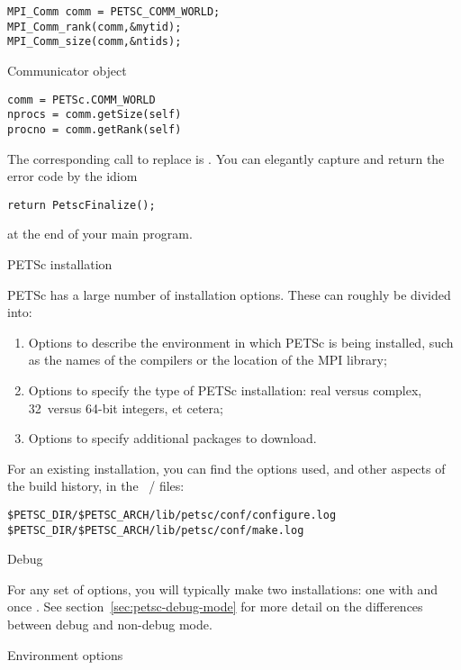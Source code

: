 \begin{lstlisting}
MPI_Comm comm = PETSC_COMM_WORLD;
MPI_Comm_rank(comm,&mytid);
MPI_Comm_size(comm,&ntids);
\end{lstlisting}

\begin{pythonnote}{Communicator object}
\begin{verbatim}
comm = PETSc.COMM_WORLD
nprocs = comm.getSize(self) 
procno = comm.getRank(self)
\end{verbatim}
\end{pythonnote}

The corresponding call to replace  is
.
You can elegantly capture and return the error code by the idiom
\begin{lstlisting}
return PetscFinalize();
\end{lstlisting}
at the end of your main program.

 {PETSc installation}
\label{sec:petsc-install}

PETSc has a large number of installation options. These can roughly be
divided into:
\begin{enumerate}
\item Options to describe the environment in which PETSc is being
  installed, such as the names of the compilers or the location of the
  MPI library;
\item Options to specify the type of PETSc installation: real versus
  complex, 32~versus 64-bit integers, et cetera;
\item Options to specify additional packages to download.
\end{enumerate}

For an existing installation, you can find the options used,
and other aspects of the build history,
in the ~/ 
files:
\begin{verbatim}
$PETSC_DIR/$PETSC_ARCH/lib/petsc/conf/configure.log
$PETSC_DIR/$PETSC_ARCH/lib/petsc/conf/make.log
\end{verbatim}

 {Debug}

For any set of options, you will typically make two installations:
one with  and once .
See section~\ref{sec:petsc-debug-mode} for more detail
on the differences between debug and non-debug mode.

 {Environment options}

